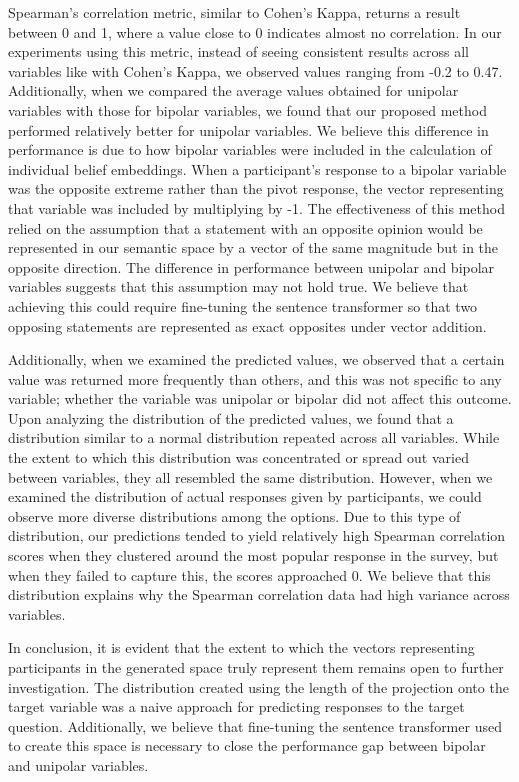 Spearman's correlation metric, similar to Cohen's Kappa, returns a result between 0 and 1, where a value close to 0 indicates almost no correlation. In our experiments using this metric, instead of seeing consistent results across all variables like with Cohen's Kappa, we observed values ranging from -0.2 to 0.47. Additionally, when we compared the average values obtained for unipolar variables with those for bipolar variables, we found that our proposed method performed relatively better for unipolar variables. We believe this difference in performance is due to how bipolar variables were included in the calculation of individual belief embeddings. When a participant's response to a bipolar variable was the opposite extreme rather than the pivot response, the vector representing that variable was included by multiplying by -1. The effectiveness of this method relied on the assumption that a statement with an opposite opinion would be represented in our semantic space by a vector of the same magnitude but in the opposite direction. The difference in performance between unipolar and bipolar variables suggests that this assumption may not hold true. We believe that achieving this could require fine-tuning the sentence transformer so that two opposing statements are represented as exact opposites under vector addition.

Additionally, when we examined the predicted values, we observed that a certain value was returned more frequently than others, and this was not specific to any variable; whether the variable was unipolar or bipolar did not affect this outcome. Upon analyzing the distribution of the predicted values, we found that a distribution similar to a normal distribution repeated across all variables. While the extent to which this distribution was concentrated or spread out varied between variables, they all resembled the same distribution. However, when we examined the distribution of actual responses given by participants, we could observe more diverse distributions among the options. Due to this type of distribution, our predictions tended to yield relatively high Spearman correlation scores when they clustered around the most popular response in the survey, but when they failed to capture this, the scores approached 0. We believe that this distribution explains why the Spearman correlation data had high variance across variables.

In conclusion, it is evident that the extent to which the vectors representing participants in the generated space truly represent them remains open to further investigation. The distribution created using the length of the projection onto the target variable was a naive approach for predicting responses to the target question. Additionally, we believe that fine-tuning the sentence transformer used to create this space is necessary to close the performance gap between bipolar and unipolar variables.
 